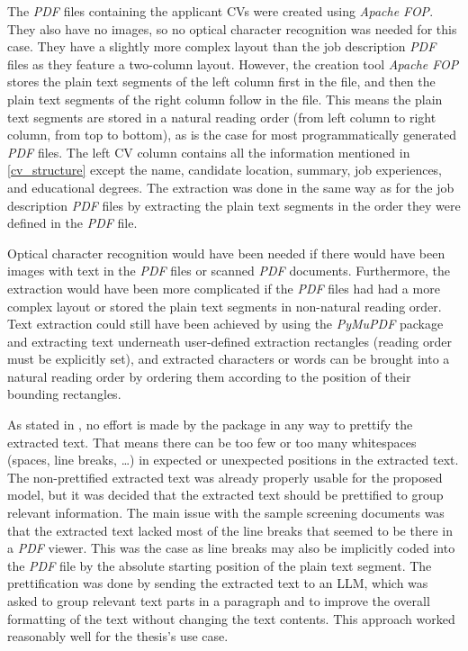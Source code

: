 \documentclass[draft,final]{thesisclass} %
\begin{document}
The \textit{PDF} files containing the applicant \acs{CV}s were created using \textit{Apache FOP}. They also have no images, so no optical character recognition was needed for this case.
They have a slightly more complex layout than the job description \textit{PDF} files as they feature a two-column layout.
However, the creation tool \textit{Apache FOP} stores the plain text segments of the left column first in the  file, and then the plain text segments of the right column follow in the file.
This means the plain text segments are stored in a natural reading order (from left column to right column, from top to bottom), as is the case for most programmatically generated \textit{PDF} files.
The left \acs{CV} column contains all the information mentioned in \ref{cv_structure} except the name, candidate location, summary, job experiences, and educational degrees.
The extraction was done in the same way as for the job description \textit{PDF} files by extracting the plain text segments in the order they were defined in the \textit{PDF} file.

Optical character recognition would have been needed if there would have been images with text in the \textit{PDF} files or scanned \textit{PDF} documents.
Furthermore, the extraction would have been more complicated if the \textit{PDF} files had had a more complex layout or stored the plain text segments in non-natural reading order.
Text extraction could still have been achieved by using the \textit{PyMuPDF} package and extracting text underneath user-defined extraction rectangles (reading order must be explicitly set), and extracted characters or words can be brought into a natural reading order by ordering them according to the position of their bounding rectangles.

As stated in \textcite{pymupdf}, no effort is made by the package in any way to prettify the extracted text.
That means there can be too few or too many whitespaces (spaces, line breaks, \dots) in expected or unexpected positions in the extracted text.
The non-prettified extracted text was already properly usable for the proposed model, but it was decided that the extracted text should be prettified to group relevant information.
The main issue with the sample screening documents was that the extracted text lacked most of the line breaks that seemed to be there in a \textit{PDF} viewer.
This was the case as line breaks may also be implicitly coded into the \textit{PDF} file by the absolute starting position of the plain text segment.
The prettification was done by sending the extracted text to an \acs{LLM}, which was asked to group relevant text parts in a paragraph and to improve the overall formatting of the text without changing the text contents.
This approach worked reasonably well for the thesis's use case.
\end{document}
